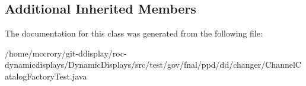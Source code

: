 \subsection*{Additional Inherited Members}


The documentation for this class was generated from the following file\-:\begin{DoxyCompactItemize}
\item 
/home/mccrory/git-\/ddisplay/roc-\/dynamicdisplays/\-Dynamic\-Displays/src/test/gov/fnal/ppd/dd/changer/Channel\-Catalog\-Factory\-Test.\-java\end{DoxyCompactItemize}
